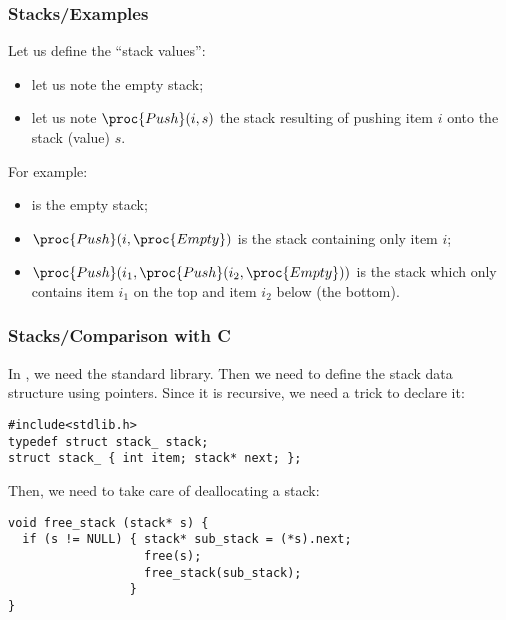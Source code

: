 %
\begin{frame}
\frametitle{Stacks/Examples}

Let us define the ``stack values'':
\begin{itemize}

  \item let us note  the empty stack;

  \item let us note \(\proc{Push} (i, s)\) the stack resulting of
    pushing item \(i\) onto the stack (value) \(s\).

\end{itemize}

\bigskip

For example:
\begin{itemize}

  \item {} is the empty stack;

  \item \(\proc{Push} (i, \proc{Empty})\) is the stack containing only
    item \(i\);

  \item \(\proc{Push} (i_1, \proc{Push} (i_2, \proc{Empty}))\) is the
    stack which only contains item \(i_1\) on the top and item \(i_2\)
    below (the bottom).

\end{itemize}

\end{frame}

%
\begin{frame}[containsverbatim]
\frametitle{Stacks/Comparison with C}

In \C, we need the standard library. Then we need to define the stack
data structure using pointers. Since it is recursive, we need a trick
to declare it:
{\small
\begin{verbatim}
#include<stdlib.h>
typedef struct stack_ stack;
struct stack_ { int item; stack* next; };
\end{verbatim}
}
Then, we need to take care of deallocating a stack:
{\small
\begin{verbatim}
void free_stack (stack* s) {
  if (s != NULL) { stack* sub_stack = (*s).next;
                   free(s);
                   free_stack(sub_stack);
                 }
}
\end{verbatim}
}

\end{frame}

